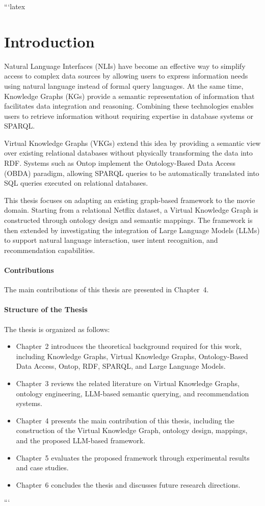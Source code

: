 

```latex
\section{Introduction}

Natural Language Interfaces (NLIs) have become an effective way to simplify access to complex data sources by allowing users to express information needs using natural language instead of formal query languages. At the same time, Knowledge Graphs (KGs) provide a semantic representation of information that facilitates data integration and reasoning. Combining these technologies enables users to retrieve information without requiring expertise in database systems or SPARQL.

Virtual Knowledge Graphs (VKGs) extend this idea by providing a semantic view over existing relational databases without physically transforming the data into RDF. Systems such as Ontop implement the Ontology-Based Data Access (OBDA) paradigm, allowing SPARQL queries to be automatically translated into SQL queries executed on relational databases.

This thesis focuses on adapting an existing graph-based framework to the movie domain. Starting from a relational Netflix dataset, a Virtual Knowledge Graph is constructed through ontology design and semantic mappings. The framework is then extended by investigating the integration of Large Language Models (LLMs) to support natural language interaction, user intent recognition, and recommendation capabilities.

\paragraph{Contributions}

The main contributions of this thesis are presented in Chapter~4.

\paragraph{Structure of the Thesis}

The thesis is organized as follows:

\begin{itemize}
    \item Chapter~2 introduces the theoretical background required for this work, including Knowledge Graphs, Virtual Knowledge Graphs, Ontology-Based Data Access, Ontop, RDF, SPARQL, and Large Language Models.
    \item Chapter~3 reviews the related literature on Virtual Knowledge Graphs, ontology engineering, LLM-based semantic querying, and recommendation systems.
    \item Chapter~4 presents the main contribution of this thesis, including the construction of the Virtual Knowledge Graph, ontology design, mappings, and the proposed LLM-based framework.
    \item Chapter~5 evaluates the proposed framework through experimental results and case studies.
    \item Chapter~6 concludes the thesis and discusses future research directions.
\end{itemize}
```
